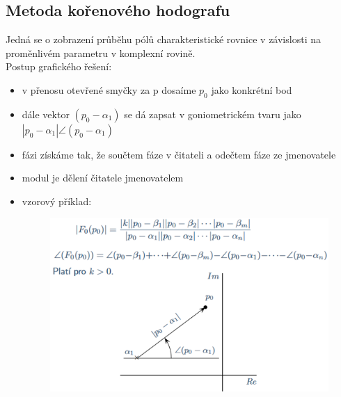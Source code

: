 \subsection*{Metoda kořenového hodografu}
Jedná se o zobrazení průběhu pólů charakteristické rovnice v závislosti na proměnlivém parametru v komplexní rovině.\\
Postup grafického řešení:
\begin{itemize}
    \item v přenosu otevřené smyčky za p dosaíme \(p_0\) jako konkrétní bod
    \item dále vektor $(p_0 - \alpha_1)$ se dá zapsat v goniometrickém tvaru jako $|p_0 - \alpha_1|\angle (p_0 - \alpha_1)$
    \item fázi získáme tak, že součtem fáze v čitateli a odečtem fáze ze jmenovatele
    \item modul je dělení čitatele jmenovatelem
    \item vzorový příklad:
          \begin{figure}[H]
              \includegraphics*[scale = 0.3]{images/hodograf.png}
          \end{figure}
\end{itemize}

